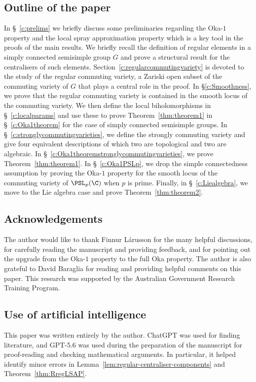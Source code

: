 \documentclass[12pt, a4paper, oneside]{amsart}
\theoremstyle{plain} %
\theoremstyle{definition} %
\theoremstyle{remark} %
\begin{document}
\subsection*{Outline of the paper}
In \S~\ref{c:prelims} we briefly discuss some preliminaries regarding the Oka-$1$ property and the local spray approximation property which is a key tool in the proofs of the main results. We briefly recall the definition of regular elements in a simply connected semisimple group $G$ and prove a structural result for the centralisers of such elements. Section~\ref{c:regularcommutingvariety} is devoted to the study of the regular commuting variety, a Zariski open subset of the commuting variety of $G$ that plays a central role in the proof. In \S\ref{c:Smoothness}, we prove that the regular commuting variety is contained in the smooth locus of the commuting variety. We then define the local biholomorphisms in \S~\ref{c:localparams} and use these to prove Theorem~\ref{thm:theorem1} in \S~\ref{c:Oka1theorem} for the case of simply connected semisimple groups. In \S~\ref{c:stronglycommutingvarieties}, we define the strongly commuting variety and give four equivalent descriptions of which two are topological and two are algebraic. In \S~\ref{c:Oka1theoremstronglycommutingvarieties}, we prove Theorem~\ref{thm:theorem1}. In \S~\ref{c:Oka1PSLp}, we drop the simple connectedness assumption by proving the Oka-$1$ property for the smooth locus of the commuting variety of $\PSL_p(\C)$ when $p$ is prime. Finally, in \S~\ref{c:Liealgebra}, we move to the Lie algebra case and prove Theorem~\ref{thm:theorem2}.
\par
\endgroup
\makeatother

\makeatletter
\begingroup
\let\@tocwrite\@gobbletwo
\subsection*{Acknowledgements}
The author would like to thank Finnur L\'arusson for the many helpful discussions, for carefully reading the manuscript and providing feedback, and for pointing out the upgrade from the Oka-$1$ property to the full Oka property. The author is also grateful to David Baraglia for reading and providing helpful comments on this paper. This research was supported by the Australian Government Research Training Program.
\par
\endgroup
\makeatother

\makeatletter
\begingroup
\let\@tocwrite\@gobbletwo
\subsection*{Use of artificial intelligence}
This paper was written entirely by the author. ChatGPT was used for finding literature, and GPT-5.6 was used during the preparation of the manuscript for proof-reading and checking mathematical arguments. In particular, it helped identify minor errors in Lemma~\ref{lem:regular-centraliser-components} and Theorem~\ref{thm:RregLSAP}. 
\par
\endgroup
\makeatother
\end{document}
